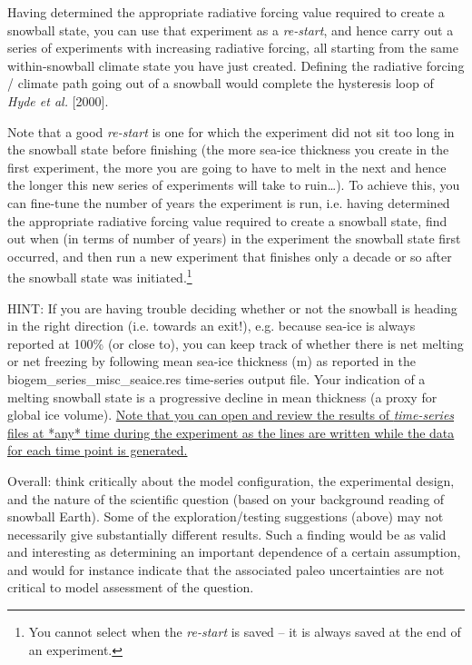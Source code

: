 \documentclass[11pt,fleqn]{book} %
\begin{document}
\noindent Having determined the appropriate radiative forcing value required to create a snowball state, you can use that experiment as a \textit{re-start}, and hence carry out a series of experiments with increasing radiative forcing, all starting from the same within-snowball climate state you have just created. Defining the radiative forcing / climate path going out of a snowball would complete the hysteresis loop of \textit{Hyde et al.} [2000]. 

Note that a good \textit{re-start} is one for which the experiment did not sit too long in the snowball state before finishing (the more sea-ice thickness you create in the first experiment, the more you are going to have to melt in the next and hence the longer this new series of experiments will take to ruin…). To achieve this, you can fine-tune the number of years the experiment is run, i.e. having determined the appropriate radiative forcing value required to create a snowball state, find out when (in terms of number of years) in the experiment the snowball state first occurred, and then run a new experiment that finishes only a decade or so after the snowball state was initiated.\footnote{You cannot select when the \textit{re-start} is saved – it is always saved at the end of an experiment.}

HINT: If you are having trouble deciding whether or not the snowball is heading in the right direction (i.e. towards an exit!), e.g. because sea-ice is always reported at 100\% (or close to), you can keep track of whether there is net melting or net freezing by following mean sea-ice thickness (m) as reported in the \textsf{\footnotesize biogem\_series\_misc\_seaice.res} time-series output file. Your indication of a melting snowball state is a progressive decline in mean thickness (a proxy for global ice volume). \uline{Note that you can open and review the results of \textit{time-series} files at *any* time during the experiment as the lines are written while the data for each time point is generated.}

Overall: think critically about the model configuration, the experimental design, and the nature of the scientific question (based on your background reading of snowball Earth). Some of the exploration/testing suggestions (above) may not necessarily give substantially different results. Such a finding would be as valid and interesting as determining an important dependence of a certain assumption, and would for instance indicate that the associated paleo uncertainties are not critical to model assessment of the question.
\end{document}
